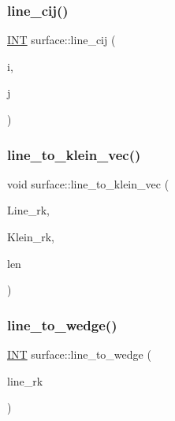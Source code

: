 \mbox{\label{classsurface_accbf5729de8322d1e230f40144308218}} 
\subsubsection{\texorpdfstring{line\+\_\+cij()}{line\_cij()}}
{\footnotesize\ttfamily \mbox{\hyperlink{galois_8h_a09fddde158a3a20bd2dcadb609de11dc}{I\+NT}} surface\+::line\+\_\+cij (\begin{DoxyParamCaption}\item[{\mbox{\hyperlink{galois_8h_a09fddde158a3a20bd2dcadb609de11dc}{I\+NT}}}]{i,  }\item[{\mbox{\hyperlink{galois_8h_a09fddde158a3a20bd2dcadb609de11dc}{I\+NT}}}]{j }\end{DoxyParamCaption})}

\mbox{\label{classsurface_a8b1782041fccd2d147fdeef4fe08e3a6}} 
\subsubsection{\texorpdfstring{line\+\_\+to\+\_\+klein\+\_\+vec()}{line\_to\_klein\_vec()}}
{\footnotesize\ttfamily void surface\+::line\+\_\+to\+\_\+klein\+\_\+vec (\begin{DoxyParamCaption}\item[{\mbox{\hyperlink{galois_8h_a09fddde158a3a20bd2dcadb609de11dc}{I\+NT}} $\ast$}]{Line\+\_\+rk,  }\item[{\mbox{\hyperlink{galois_8h_a09fddde158a3a20bd2dcadb609de11dc}{I\+NT}} $\ast$}]{Klein\+\_\+rk,  }\item[{\mbox{\hyperlink{galois_8h_a09fddde158a3a20bd2dcadb609de11dc}{I\+NT}}}]{len }\end{DoxyParamCaption})}

\mbox{\label{classsurface_aea15853e991bf9a363abf647f8bcb70c}} 
\subsubsection{\texorpdfstring{line\+\_\+to\+\_\+wedge()}{line\_to\_wedge()}}
{\footnotesize\ttfamily \mbox{\hyperlink{galois_8h_a09fddde158a3a20bd2dcadb609de11dc}{I\+NT}} surface\+::line\+\_\+to\+\_\+wedge (\begin{DoxyParamCaption}\item[{\mbox{\hyperlink{galois_8h_a09fddde158a3a20bd2dcadb609de11dc}{I\+NT}}}]{line\+\_\+rk }\end{DoxyParamCaption})}


